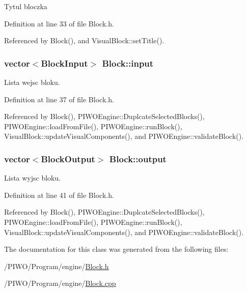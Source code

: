 Tytul bloczka 

Definition at line 33 of file Block.h.

Referenced by Block(), and VisualBlock::setTitle().\hypertarget{classBlock_6a6c2c1e8c3fd4219d8cc7e9f099205b}{
\subsubsection[input]{\setlength{\rightskip}{0pt plus 5cm}vector$<${\bf BlockInput}$>$ {\bf Block::input}}}
\label{classBlock_6a6c2c1e8c3fd4219d8cc7e9f099205b}


Lista wejsc bloku. 

Definition at line 37 of file Block.h.

Referenced by Block(), PIWOEngine::DuplcateSelectedBlocks(), PIWOEngine::loadFromFile(), PIWOEngine::runBlock(), VisualBlock::updateVisualComponents(), and PIWOEngine::validateBlock().\hypertarget{classBlock_7afddb4a8f6063e0b05dbdd1f17cf07f}{
\subsubsection[output]{\setlength{\rightskip}{0pt plus 5cm}vector$<${\bf BlockOutput}$>$ {\bf Block::output}}}
\label{classBlock_7afddb4a8f6063e0b05dbdd1f17cf07f}


Lista wyjsc bloku. 

Definition at line 41 of file Block.h.

Referenced by Block(), PIWOEngine::DuplcateSelectedBlocks(), PIWOEngine::loadFromFile(), PIWOEngine::runBlock(), VisualBlock::updateVisualComponents(), and PIWOEngine::validateBlock().

The documentation for this class was generated from the following files:\begin{CompactItemize}
\item 
/PIWO/Program/engine/\hyperlink{Block_8h}{Block.h}\item 
/PIWO/Program/engine/\hyperlink{Block_8cpp}{Block.cpp}\end{CompactItemize}
